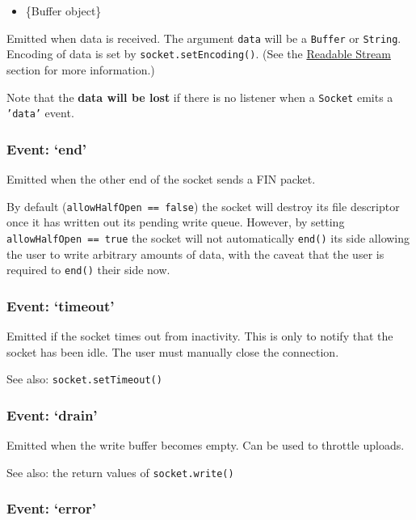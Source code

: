 \begin{itemize}
\itemsep1pt\parskip0pt
\item
  \{Buffer object\}
\end{itemize}

Emitted when data is received. The argument \texttt{data} will be a
\texttt{Buffer} or \texttt{String}. Encoding of data is set by
\texttt{socket.setEncoding()}. (See the
\href{stream.html\#stream_readable_stream}{Readable Stream} section for
more information.)

Note that the \textbf{data will be lost} if there is no listener when a
\texttt{Socket} emits a \texttt{'data'} event.

\subsubsection{Event: `end'}\label{event-end}

Emitted when the other end of the socket sends a FIN packet.

By default (\texttt{allowHalfOpen == false}) the socket will destroy its
file descriptor once it has written out its pending write queue.
However, by setting \texttt{allowHalfOpen == true} the socket will not
automatically \texttt{end()} its side allowing the user to write
arbitrary amounts of data, with the caveat that the user is required to
\texttt{end()} their side now.

\subsubsection{Event: `timeout'}\label{event-timeout}

Emitted if the socket times out from inactivity. This is only to notify
that the socket has been idle. The user must manually close the
connection.

See also: \texttt{socket.setTimeout()}

\subsubsection{Event: `drain'}\label{event-drain}

Emitted when the write buffer becomes empty. Can be used to throttle
uploads.

See also: the return values of \texttt{socket.write()}

\subsubsection{Event: `error'}\label{event-error-1}

